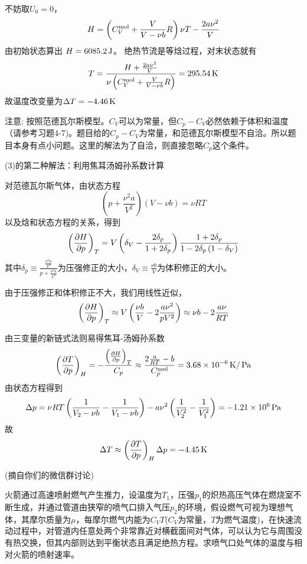 \documentclass[CJK]{beamer}
\begin{document}
\begin{frame}
  \bch
      {\small
        不妨取$U_0=0$，
    $$ H  = \left(C_V^{\rm mol} + \frac{V}{V-\nu b}R\right) \nu T -\frac{2a\nu^2}{V}$$
        由初始状态算出
        $H = 6085.2\,\mathrm{J}$。
        绝热节流是等焓过程，对末状态就有
        $$T = \frac{H+\frac{2a\nu^2}{V}}{\nu \left(C_V^{\rm mol}+ \frac{V}{V-\nu b}R\right)} = 295.54\,\mathrm{K} $$
        故温度改变量为$\Delta T = -4.46 \,\mathrm{K}$

        \skipline
        {\scriptsize
        注意: 按照范德瓦尔斯模型。$C_V$可以为常量，但$C_p-C_V$必然依赖于体积和温度（请参考习题4-7)。题目给的$C_p -C_V$为常量，和范德瓦尔斯模型不自洽。所以题目本身有点小问题。这里的解法为了自洽，则直接忽略$C_p$这个条件。}
      }
  \ech
\end{frame}
\begin{frame}
  \bch
      {\small
        (3)的第二种解法：利用焦耳汤姆孙系数计算

         对范德瓦尔斯气体，由状态方程
$$\left(p + \frac{\nu^2 a}{V^2}\right) \left(V - \nu b\right) = \nu RT$$
以及焓和状态方程的关系，得到
$$\left(\frac{\partial H}{\partial p}\right)_{T} = V \left(\delta_V - \frac{2\delta_p}{1+2\delta_p}\right) \frac{1+2\delta_p}{1-2\delta_p\left(1-\delta_V\right)}$$
其中$\delta_p \equiv \frac{\frac{\nu^2a}{V^2}}{p+\frac{\nu^2 a}{V^2}}$为压强修正的大小，$\delta_V\equiv \frac{\nu b}{V}$为体积修正的大小。
        
由于压强修正和体积修正不大，我们用线性近似，
        $$\left(\frac{\partial H}{\partial p}\right)_{T} \approx V\left(\frac{\nu b}{V} - 2\frac{a\nu^2}{pV^2}\right)\approx \nu b - 2\frac{a\nu}{RT}$$
      }

      \ech
\end{frame}

\begin{frame}
  \bch
  {\small
  由三变量的新链式法则易得焦耳-汤姆孙系数
        $$\left(\frac{\partial T}{\partial p}\right)_{H} = -\frac{\left(\frac{\partial H}{\partial p}\right)_{T}}{C_p} \approx \frac{2\frac{a}{RT}-b}{C_p^{\rm mol}} =  3.68\times 10^{-6}\,\mathrm{K}/\,\mathrm{Pa}$$
        由状态方程得到
        $$\Delta p = \nu RT\left(\frac{1}{V_2-\nu b}-\frac{1}{V_1-\nu b}\right) -a\nu^2\left(\frac{1}{V_2^2}-\frac{1}{V_1^2}\right)= -1.21\times 10^6\,\mathrm{Pa}$$
        故
        $$\Delta T \approx \left(\frac{\partial T}{\partial p}\right)_{H} \Delta p = -4.45\,\mathrm{K}$$
  }
  \ech
\end{frame}

\begin{frame}
  \chtitle{\proid (\sthree)}
  \bch
  (摘自你们的微信群讨论)

  火箭通过高速喷射燃气产生推力，设温度为$T_1$，压强$p_1$的炽热高压气体在燃烧室不断生成，并通过管道由狭窄的喷气口排入气压$p_2$的环境，假设燃气可视为理想气体，其摩尔质量为$\mu$，每摩尔燃气内能为$C_VT$($C_V$为常量，$T$为燃气温度)，在快速流动过程中，对管道内任意处两个非常靠近对横截面间对气体，可以认为它与周围没有热交换，但其内部则达到平衡状态且满足绝热方程。求喷气口处气体的温度与相对火箭的喷射速率。
  \ech
\end{frame}
\end{document}
